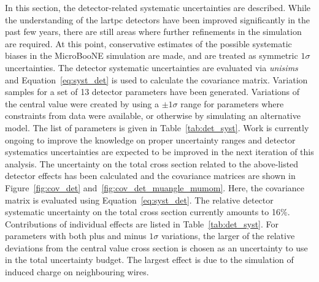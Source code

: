 In this section, the detector-related systematic uncertainties are described. While the understanding of the \acrshort{lartpc} detectors have been improved significantly in the past few years, there are still areas where further refinements in the simulation are required. At this point, conservative estimates of the possible systematic biases in the MicroBooNE simulation are made, and are treated as symmetric $1\sigma$ uncertainties.
The detector systematic uncertainties are evaluated via \emph{unisims} and Equation~\eqref{eq:syst_det} is used to calculate the covariance matrix. Variation samples for a set of 13 detector parameters have been generated. Variations of the central value were created by using a $\pm1\sigma$ range for parameters where constraints from data were available, or otherwise by simulating an alternative model. The list of parameters is given in Table~\ref{tab:det_syst}.
Work is currently ongoing to improve the knowledge on proper uncertainty ranges and detector systematics uncertainties are expected to be improved in the next iteration of this analysis.
The uncertainty on the total cross section related to the above-listed detector effects has been calculated and the covariance matrices are shown in Figure~\ref{fig:cov_det} and~\ref{fig:cov_det_muangle_mumom}. Here, the covariance matrix is evaluated using Equation~\ref{eq:syst_det}. 
 The relative detector systematic uncertainty on the total cross section currently amounts to 16\%. Contributions of individual effects are listed in Table~\ref{tab:det_syst}. For parameters with both plus and minus $1\sigma$ variations, the larger of the relative deviations from the central value cross section is chosen as an uncertainty to use in the total uncertainty budget. The largest effect is due to the simulation of induced charge on neighbouring wires. 


